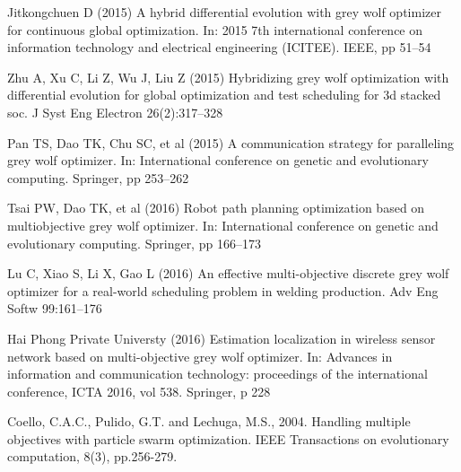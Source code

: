 \begin{thebibliography}{9}
Jitkongchuen D (2015) A hybrid differential evolution with grey
wolf optimizer for continuous global optimization. In: 2015 7th
international conference on information technology and electrical
engineering (ICITEE). IEEE, pp 51–54

Zhu A, Xu C, Li Z, Wu J, Liu Z (2015) Hybridizing grey wolf
optimization with differential evolution for global optimization
and test scheduling for 3d stacked soc. J Syst Eng Electron
26(2):317–328

Pan TS, Dao TK, Chu SC, et al (2015) A communication
strategy for paralleling grey wolf optimizer. In: International
conference on genetic and evolutionary computing. Springer,
pp 253–262

Tsai PW, Dao TK, et al (2016) Robot path planning optimization
based on multiobjective grey wolf optimizer. In: International
conference on genetic and evolutionary computing.
Springer, pp 166–173

Lu C, Xiao S, Li X, Gao L (2016) An effective multi-objective
discrete grey wolf optimizer for a real-world scheduling problem
in welding production. Adv Eng Softw 99:161–176

Hai Phong Private Universty (2016) Estimation localization in
wireless sensor network based on multi-objective grey wolf
optimizer. In: Advances in information and communication
technology: proceedings of the international conference, ICTA
2016, vol 538. Springer, p 228

Coello, C.A.C., Pulido, G.T. and Lechuga, M.S., 2004. Handling multiple objectives with particle swarm optimization. IEEE Transactions on evolutionary computation, 8(3), pp.256-279.

\end{thebibliography}


